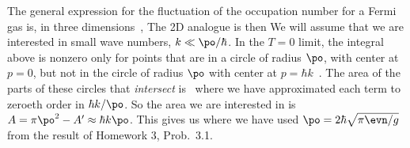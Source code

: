 {	The general expression for the fluctuation of the occupation number for a Fermi gas is, in three dimensions~\cite[p.~356]{Landau2},
	The 2D analogue is then
	We will assume that we are interested in small wave numbers, $k \ll \po / \hbar$.  In the $T =  0$ limit, the integral above is nonzero only for points that are in a circle of radius $\po$, with center at $p = 0$, but not in the circle of radius $\po$ with center at $p = \hbar k$~\cite[p.~357]{Landau}.  The area of the parts of these circles that \emph{intersect} is~\cite{Intersection}
	where we have approximated each term to zeroeth order in $\hbar k / \po$.  So the area we are interested in is $A = \pi \po^2 - A' \approx \hbar k \po$.  This gives us
	where we have used $\po = 2\hbar \sqrt{\pi \evn / g}$ from the result of Homework 3, Prob.~{3.1}.
}


%
%



